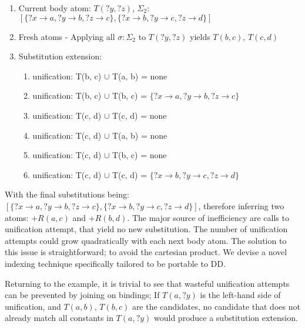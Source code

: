 \documentclass[sigconf,screen,review=false,natbib]{acmart}
\theoremstyle{definition}
\begin{document}
\begin{enumerate}
\begin{enumerate}
		      \item Current body atom: $T(?y, ?z)$, $\Sigma_2$: $[\{?x \rightarrow a, ?y \rightarrow b, ?z \rightarrow c\}, \{?x \rightarrow b, ?y \rightarrow c, ?z \rightarrow d\}]$
		      \item Fresh atoms - Applying all $\sigma : \Sigma_2$ to $T(?y, ?z)$ yields $T(b, c)$, $T(c, d)$
		      \item Substitution extension: \begin{enumerate}
			            \item unification: T(b, c) $\cup$ T(a, b) = none
			            \item unification: T(b, c) $\cup$ T(b, c) = $\{?x \rightarrow a, ?y \rightarrow b, ?z \rightarrow c\}$
			            \item unification: T(c, d) $\cup$ T(c, d) = none
			            \item unification: T(c, d) $\cup$ T(a, b) = none
			            \item unification: T(c, d) $\cup$ T(b, c) = none
			            \item unification: T(c, d) $\cup$ T(c, d) = $\{?x \rightarrow b, ?y \rightarrow c, ?z \rightarrow d\}$
		            \end{enumerate}
	      \end{enumerate}
\end{enumerate}
With the final substitutions being: $[\{?x \rightarrow a, ?y \rightarrow b, ?z \rightarrow c\}, \{?x \rightarrow b, ?y \rightarrow c, ?z \rightarrow d\}]$, therefore inferring two atoms:
$+R(a, c)$ and $+R(b, d)$. The major source of inefficiency are calls to unification attempt, that yield no new substitution. The number
of unification attempts could grow quadratically with each next body atom. The solution to this issue is straightforward; to
avoid the cartesian product. We devise a novel indexing technique specifically tailored to be portable to DD.

Returning to the example, it is trivial to see that wasteful unification attempts can be prevented by joining on bindings; If $T(a, ?y)$ is the
left-hand side of unification, and $T(a, b)$, $T(b, c)$ are the candidates, no candidate that does not already match all constants
in $T(a, ?y)$ would produce a substitution extension.
\end{document}
